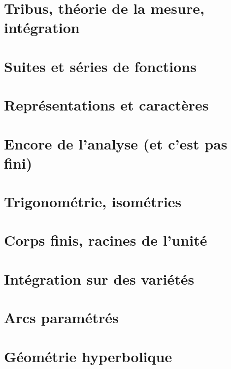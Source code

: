 \documentclass[a4paper,twoside,11pt]{book}
\begin{document}
\chapter{Tribus, théorie de la mesure, intégration}






\chapter{Suites et séries de fonctions}





\chapter{Représentations et caractères}


\chapter{Encore de l'analyse (et c'est pas fini)}





\chapter{Trigonométrie, isométries}






\chapter{Corps finis, racines de l'unité}


\chapter{Intégration sur des variétés}







\chapter{Arcs paramétrés}




\chapter{Géométrie hyperbolique}

\end{document}
